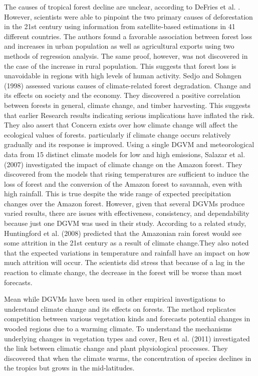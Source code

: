 The causes of tropical forest decline are unclear, according to DeFries et al. \parencite{defries2010} . However, scientists were able to pinpoint the two primary causes of deforestation in the 21st century using information from satellite-based estimations in 41 different countries. The authors found a favorable association between forest loss and increases in urban population as well as agricultural exports using two methods of regression analysis. The same proof, however, was not discovered in the case of the increase in rural
population. This suggests that forest loss is unavoidable in regions with high levels of human activity.
Sedjo and Sohngen (1998) assessed various causes of climate-related forest degradation.  Change and its effects on society and the economy. They discovered a positive correlation between  forests in general, climate change, and timber harvesting. This suggests that earlier  Research results indicating serious implications have inflated the risk. They also assert that  Concern exists over how climate change will affect the ecological values of forests.  particularly if climate change occurs relatively gradually and its response is improved.
Using a single DGVM and meteorological data from 15 distinct climate models for low and high emissions, Salazar et al. (2007) investigated the impact of climate change on the Amazon forest. They discovered from the models that rising temperatures are sufficient to induce the loss of forest and the conversion of the Amazon forest to savannah, even with high rainfall. This is true despite the wide range of expected precipitation changes over the Amazon forest. However, given that several DGVMs produce varied results, there are issues with effectiveness, consistency, and dependability because just one DGVM was used in their study. According to a related study, Huntingford et al. (2008) predicted that the Amazonian rain forest would see some attrition in the 21st century as a result of climate change.They also noted that the expected variations in temperature and rainfall have an impact on how much attrition will occur. The scientists did stress that because of a lag in the reaction to climate change, the decrease in the forest will be worse than most forecasts.

Mean while DGVMs have been used in other empirical investigations to understand climate change and its effects on forests. The method replicates competition between various vegetation kinds and forecasts potential changes in wooded regions due to a warming climate. To understand the mechanisms underlying changes in vegetation types and cover, Reu et al. (2011) investigated the link between climatic change and plant physiological processes. They discovered that when the climate warms, the concentration of species declines in the tropics but grows in the mid-latitudes.

